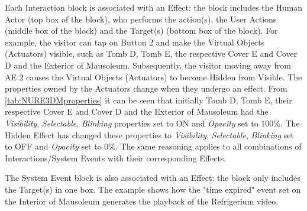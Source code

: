 Each Interaction block is associated with an Effect: the block includes the Human Actor (top box of the block), who performs the action(s), the User Actions (middle box of the block) and the Target(s) (bottom box of the block). For example, the visitor can tap on Button 2 and make the Virtual Objects (Actuators) visible, such as Tomb D, Tomb E, the respective Cover E and Cover D and the Exterior of Mausoleum. Subsequently, the visitor moving away from AE 2 causes the Virtual Objects (Actuators) to become Hidden from Visible. The properties owned by the Actuators change when they undergo an effect. 
From \autoref{tab:NURE3DMproperties} it can be seen that initially Tomb D, Tomb E, their respective Cover E and Cover D and the Exterior of Mausoleum had the \textit{Visibility}, \textit{Selectable}, \textit{Blinking} properties set to ON and \textit{Opacity} set to 100\%. The Hidden Effect has changed these properties to \textit{Visibility}, \textit{Selectable}, \textit{Blinking} set to OFF and \textit{Opacity} set to 0\%. 
The same reasoning applies to all combinations of Interactions/System Events with their corresponding Effects.

The System Event block is also associated with an Effect: the block only includes the Target(s) in one box. The example shows how the "time expired" event set on the Interior of Mausoleum generates the playback of the Refrigerium video.

